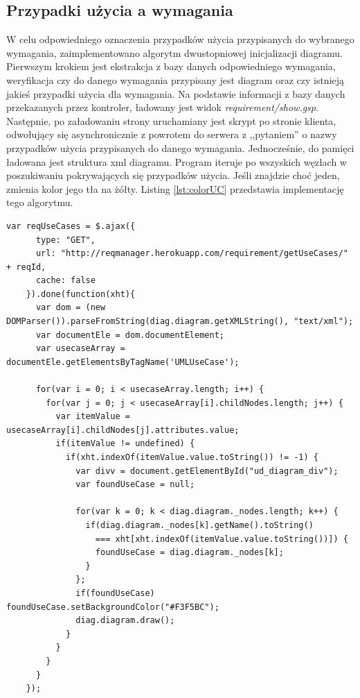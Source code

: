     \subsection{Przypadki użycia a wymagania}
    
      W celu odpowiedniego oznaczenia przypadków użycia przypisanych do wybranego wymagania, zaimplementowano algorytm dwustopniowej inicjalizacji diagramu. Pierwszym krokiem jest ekstrakcja z bazy danych odpowiedniego wymagania, weryfikacja czy do danego wymagania przypisany jest diagram oraz czy istnieją jakieś przypadki użycia dla wymagania. Na podstawie informacji z bazy danych przekazanych przez kontroler, ładowany jest widok \emph{requirement/show.gsp}. Następnie, po załadowaniu strony uruchamiany jest skrypt po stronie klienta, odwołujący się asynchronicznie z powrotem do serwera z ,,pytaniem'' o nazwy przypadków użycia przypisanych do danego wymagania. Jednocześnie, do pamięci ładowana jest struktura xml diagramu. Program iteruje po wszyskich węzłach w poszukiwaniu pokrywających się przypadków użycia. Jeśli znajdzie choć jeden, zmienia kolor jego tła na żółty. Listing \ref{lst:colorUC} przedstawia implementację tego algorytmu.
      
    
    \begin{lstlisting}[caption={Mechanizm oznaczania przypadku użycia przypisanego do aktualnie otwartego wymagania}, label={lst:colorUC}]
    var reqUseCases = $.ajax({
      type: "GET",
      url: "http://reqmanager.herokuapp.com/requirement/getUseCases/" + reqId,
      cache: false
    }).done(function(xht){ 
      var dom = (new DOMParser()).parseFromString(diag.diagram.getXMLString(), "text/xml");
      var documentEle = dom.documentElement;
      var usecaseArray = documentEle.getElementsByTagName('UMLUseCase');

      for(var i = 0; i < usecaseArray.length; i++) {
        for(var j = 0; j < usecaseArray[i].childNodes.length; j++) {
          var itemValue = usecaseArray[i].childNodes[j].attributes.value;
          if(itemValue != undefined) {
            if(xht.indexOf(itemValue.value.toString()) != -1) {
              var divv = document.getElementById("ud_diagram_div");
              var foundUseCase = null;

              for(var k = 0; k < diag.diagram._nodes.length; k++) {
                if(diag.diagram._nodes[k].getName().toString() 
                  === xht[xht.indexOf(itemValue.value.toString())]) {
                  foundUseCase = diag.diagram._nodes[k]; 
                }
              };
              if(foundUseCase) foundUseCase.setBackgroundColor("#F3F5BC");
              diag.diagram.draw();
            }
          }
        }
      }
    });
    \end{lstlisting}

